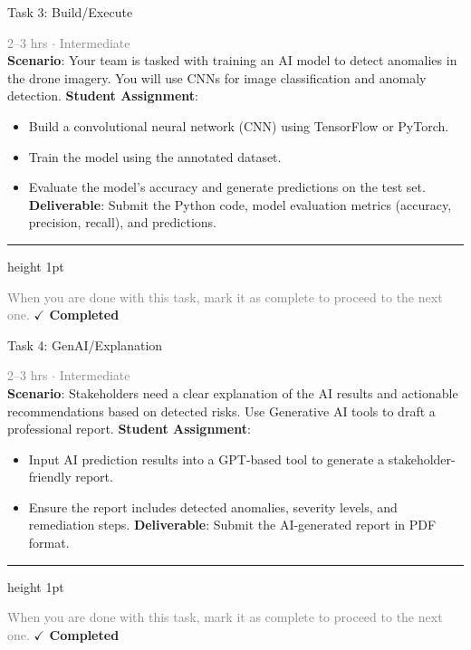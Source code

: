 \documentclass[10pt,a4paper]{article}
\begin{document}
\begin{taskbox}{Task 3: Build/Execute}

    {\small \textcolor{gray}{2--3 hrs $\cdot$ Intermediate}}\\[12pt]

    \textbf{Scenario}: Your team is tasked with training an AI model to detect anomalies in the drone imagery. You will use CNNs for image classification and anomaly detection.  
\textbf{Student Assignment}:  
\begin{itemize}
    \item Build a convolutional neural network (CNN) using TensorFlow or PyTorch.  
    \item Train the model using the annotated dataset.  
    \item Evaluate the model's accuracy and generate predictions on the test set.  
\textbf{Deliverable}: Submit the Python code, model evaluation metrics (accuracy, precision, recall), and predictions.\par
\end{itemize}

    \vspace{16pt}

    \textcolor{cardBorder}{\hrule height 1pt}\vspace{8pt}

    \small \textcolor{gray}{When you are done with this task, mark it as complete to proceed to the next one.} \hfill \textbf{\textcolor{brandDark}{$\checkmark$ Completed}}

\end{taskbox}

\begin{taskbox}{Task 4: GenAI/Explanation}

    {\small \textcolor{gray}{2--3 hrs $\cdot$ Intermediate}}\\[12pt]

    \textbf{Scenario}: Stakeholders need a clear explanation of the AI results and actionable recommendations based on detected risks. Use Generative AI tools to draft a professional report.  
\textbf{Student Assignment}:  
\begin{itemize}
    \item Input AI prediction results into a GPT-based tool to generate a stakeholder-friendly report.  
    \item Ensure the report includes detected anomalies, severity levels, and remediation steps.  
\textbf{Deliverable}: Submit the AI-generated report in PDF format.\par
\end{itemize}

    \vspace{16pt}

    \textcolor{cardBorder}{\hrule height 1pt}\vspace{8pt}

    \small \textcolor{gray}{When you are done with this task, mark it as complete to proceed to the next one.} \hfill \textbf{\textcolor{brandDark}{$\checkmark$ Completed}}

\end{taskbox}
\end{document}
